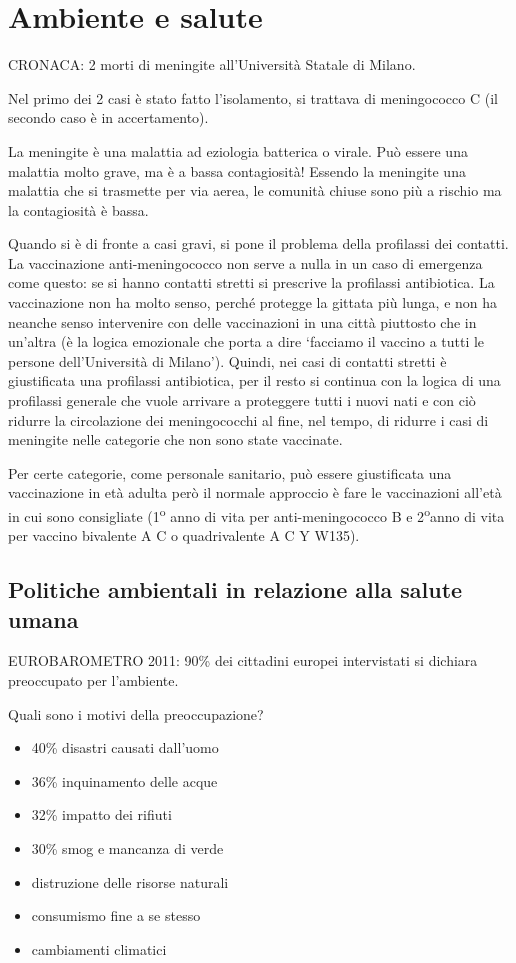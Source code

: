 \section{Ambiente e salute}

CRONACA: 2 morti di meningite all'Università Statale di Milano.

Nel primo dei 2 casi è stato fatto l'isolamento, si trattava di
meningococco C (il secondo caso è in accertamento).

La meningite è una malattia ad eziologia batterica o virale. Può essere
una malattia molto grave, ma è a bassa contagiosità! Essendo la
meningite una malattia che si trasmette per via aerea, le comunità
chiuse sono più a rischio ma la contagiosità è bassa.

Quando si è di fronte a casi gravi, si pone il problema della profilassi
dei contatti. La vaccinazione anti-meningococco non serve a nulla in un
caso di emergenza come questo: se si hanno contatti stretti si prescrive
la profilassi antibiotica. La vaccinazione non ha molto senso, perché
protegge la gittata più lunga, e non ha neanche senso intervenire con
delle vaccinazioni in una città piuttosto che in un'altra (è la logica
emozionale che porta a dire `facciamo il vaccino a tutti le persone
dell'Università di Milano'). Quindi, nei casi di contatti stretti è
giustificata una profilassi antibiotica, per il resto si continua con la
logica di una profilassi generale che vuole arrivare a proteggere tutti
i nuovi nati e con ciò ridurre la circolazione dei meningococchi al
fine, nel tempo, di ridurre i casi di meningite nelle categorie che non
sono state vaccinate.

Per certe categorie, come personale sanitario, può essere giustificata
una vaccinazione in età adulta però il normale approccio è fare le
vaccinazioni all'età in cui sono consigliate (1\textsuperscript{o} anno di vita per
anti-meningococco B e 2\textsuperscript{o}anno di vita per vaccino bivalente A C o
quadrivalente A C Y W135).

\subsection{Politiche ambientali in relazione alla salute umana}

EUROBAROMETRO 2011: 90\% dei cittadini europei intervistati si dichiara
preoccupato per l'ambiente.

Quali sono i motivi della preoccupazione?

\begin{itemize}
\item
  40\% disastri causati dall'uomo
\item
  36\% inquinamento delle acque
\item
  32\% impatto dei rifiuti
\item
  30\% smog e mancanza di verde
\item
  distruzione delle risorse naturali
\item
  consumismo fine a se stesso
\item
  cambiamenti climatici
\end{itemize}


